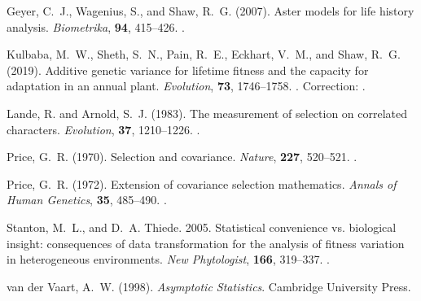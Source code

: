 \documentclass[11pt]{article}
\begin{document}
\begin{thebibliography}{}
Geyer, C.~J., Wagenius, S., and Shaw, R.~G. (2007).
\newblock Aster models for life history analysis.
\newblock \emph{Biometrika}, \textbf{94}, 415--426.
\newblock {}.

Kulbaba, M.~W., Sheth, S.~N., Pain, R.~E., Eckhart, V.~M., and
    Shaw, R.~G. (2019).
\newblock Additive genetic variance for lifetime fitness and the capacity
    for adaptation in an annual plant.
\newblock \emph{Evolution}, \textbf{73}, 1746--1758.
\newblock {}.
\newblock Correction: \citet{zenodo}.

Lande, R. and Arnold, S.~J. (1983).
\newblock The measurement of selection on correlated characters.
\newblock \emph{Evolution}, \textbf{37}, 1210--1226.
\newblock {}.

Price, G.~R. (1970).
\newblock Selection and covariance.
\newblock \emph{Nature}, \textbf{227}, 520--521.
\newblock {}.

Price, G.~R. (1972).
\newblock Extension of covariance selection mathematics.
\newblock \emph{Annals of Human Genetics}, \textbf{35}, 485--490.
\newblock {}.

Stanton, M.~L., and D.~A. Thiede. 2005.
\newblock Statistical convenience vs. biological insight: consequences of
    data transformation for the analysis of fitness variation in
    heterogeneous environments.
\newblock \emph{New Phytologist}, \textbf{166}, 319--337.
\newblock {}.

van der Vaart, A.~W. (1998).
\newblock \emph{Asymptotic Statistics}.
\newblock Cambridge University Press.

\end{thebibliography}
\end{document}
